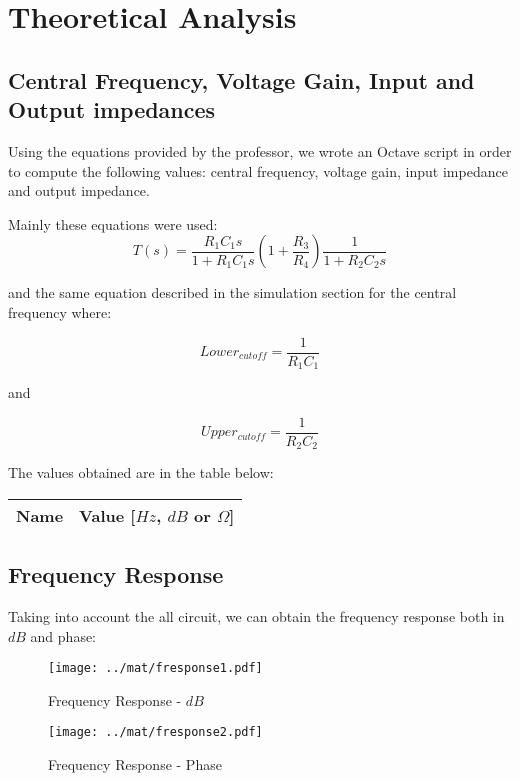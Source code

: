 \section{Theoretical Analysis}
\label{sec:analysis}

\subsection{Central Frequency, Voltage Gain, Input and Output impedances}
Using the equations provided by the professor, we wrote an Octave script in order to compute the following values: central frequency, voltage gain, input impedance and output impedance. \par
Mainly these equations were used:
\begin{equation}
    T(s) = \frac{R_1 C_1 s}{1+ R_1 C_1 s} (1+\frac{R_3}{R_4}) \frac{1}{1+ R_2 C_2 s}
\end{equation}\par
and the same equation described in the simulation section for the central frequency where: \par
\begin{equation}
    Lower_{cutoff} = \frac{1}{R_1 C_1}
\end{equation}\par
and \par
\begin{equation}
    Upper_{cutoff} = \frac{1}{R_2 C_2}
\end{equation}\par
The values obtained are in the table below:

\begin{center}
  \begin{tabular}{ | c | c | }
    \hline    
    {\bf Name} & {\bf Value [$Hz$, $dB$ or $\Omega$]} \\ \hline
    
    \hline
  \end{tabular}
\end{center}

\subsection{Frequency Response}
Taking into account the all circuit, we can obtain the frequency response both in $dB$ and phase:\par

\begin{figure}[H] \centering
\texttt{[image: ../mat/fresponse1.pdf]}
\caption{Frequency Response - $dB$}
\label{fig:fresponse1}
\end{figure}

\begin{figure}[H] \centering
\texttt{[image: ../mat/fresponse2.pdf]}
\caption{Frequency Response - Phase}
\label{fig:fresponse2}
\end{figure}
